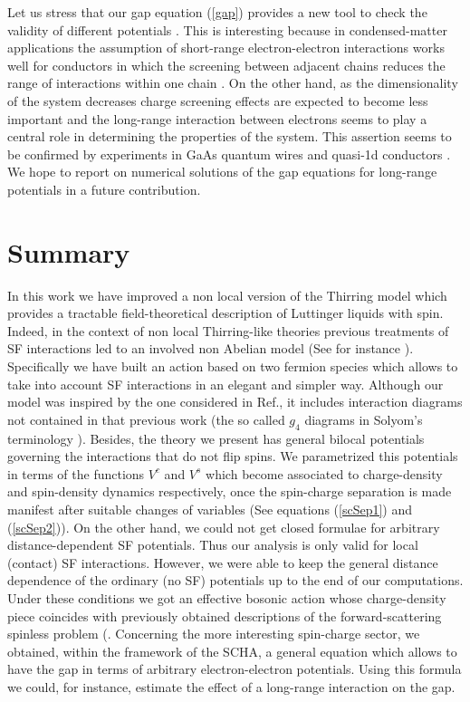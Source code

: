 \documentclass[a4paper,a4paper]{article}
\begin{document}
Let us stress that our gap equation (\ref{gap}) provides a new tool to check the
validity of different potentials \cite{Iucci}. This is interesting because in
condensed-matter applications the assumption of short-range electron-electron
interactions works well for conductors in which the screening between adjacent chains
reduces the range of interactions within one chain \cite{Schulz1}. On the other hand,
as the dimensionality of the system decreases charge screening effects are expected to
become less important and the long-range interaction between electrons seems to play a
central role in determining the properties of the system. This assertion seems to be
confirmed by experiments in GaAs quantum wires \cite{quantum wires} and quasi-1d
conductors \cite{quasi-exp}. We hope to report on numerical solutions of the gap
equations for long-range potentials in a future contribution.


\section{Summary}
In this work we have improved a non local version of the Thirring model which provides
a tractable field-theoretical description of Luttinger liquids with spin. Indeed, in
the context of non local Thirring-like theories previous treatments of SF interactions
led to an involved non Abelian model (See for instance \cite{NLT1}). Specifically we
have built an action based on two fermion species which allows to take into account SF
interactions in an elegant and simpler way. Although our model was inspired by the one
considered in Ref.\cite{Zinn-Justin}, it includes interaction diagrams not contained
in that previous work (the so called $g_4$ diagrams in Solyom's terminology
\cite{Solyom}). Besides, the theory we present has general bilocal potentials
governing the interactions that do not flip spins. We parametrized this potentials in
terms of the functions $V^c$ and $V^s$ which become associated to charge-density and
spin-density dynamics respectively, once the spin-charge separation is made manifest
after suitable changes of variables (See equations (\ref{scSep1}) and (\ref{scSep2})).
On the other hand, we could not get closed formulae for arbitrary distance-dependent
SF potentials. Thus our analysis is only valid for local (contact) SF interactions.
However, we were able to keep the general distance dependence of the ordinary (no SF)
potentials up to the end of our computations. Under these conditions we got an
effective bosonic action whose charge-density piece coincides with previously obtained
descriptions of the forward-scattering spinless problem (\cite{NLT1}. Concerning the
more interesting spin-charge sector, we obtained, within the framework of the SCHA, a
general equation which allows to have the gap in terms of arbitrary electron-electron
potentials. Using this formula we could, for instance, estimate the effect of a
long-range interaction on the gap. \vspace{0.5cm}
\end{document}
